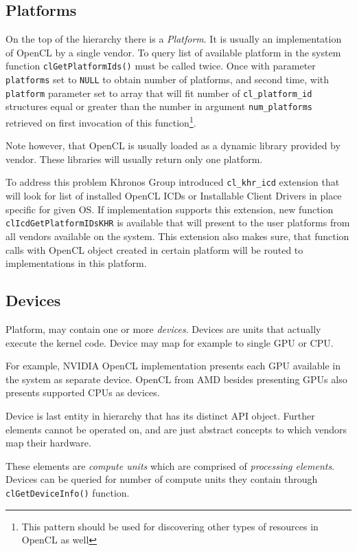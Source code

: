 \subsection{Platforms}

On the top of the hierarchy there is a \emph{Platform}. It is usually an implementation
of OpenCL by a single vendor. To query list of available platform in the system
function \texttt{clGetPlatformIds()} must be called twice. Once with parameter
\texttt{platforms} set to \texttt{NULL} to obtain number of platforms, and
second time, with \texttt{platform} parameter set to array that will fit
number of \texttt{cl\_platform\_id} structures equal or greater than the number
in argument \texttt{num\_platforms} retrieved on first invocation of this
function\footnote{This pattern should be used for discovering other types of resources
in OpenCL as well}.

Note however, that OpenCL is usually loaded as a dynamic library provided by
vendor. These libraries will usually return only one platform.

To address this problem Khronos Group introduced \texttt{cl\_khr\_icd} extension
that will look for list of installed OpenCL
ICDs or Installable Client Drivers in place specific for given OS. If
implementation supports this extension, new function \texttt{clIcd\-Get\-Platform\-IDsKHR}
is available that will present to the user platforms from all vendors available
on the system. This extension also makes sure, that function calls with OpenCL
object created in certain platform will be routed to implementations in this
platform.

\subsection{Devices}

Platform, may contain one or more \emph{devices}. Devices are units that
actually execute the kernel code. Device may map for example to single GPU or
CPU.

For example, NVIDIA OpenCL implementation presents each GPU available in the
system as separate device. OpenCL from AMD besides presenting GPUs also presents
supported CPUs as devices.

Device is last entity in hierarchy that has its distinct API object. Further
elements cannot be operated on, and are just abstract concepts to which vendors
map their hardware.

These elements are \emph{compute units} which are comprised of \emph{processing
elements}. Devices can be queried for number of compute units they contain
through \texttt{clGetDeviceInfo()} function.


